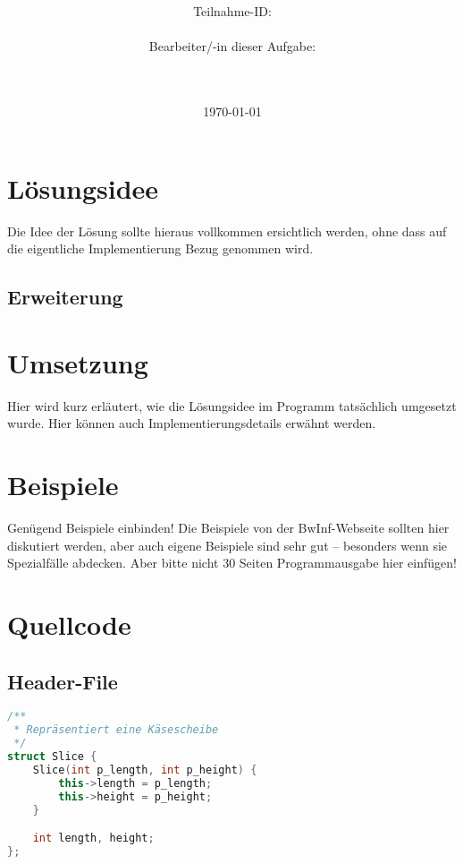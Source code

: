 \documentclass[a4paper,10pt,ngerman]{scrartcl}
\title{\textbf{\Huge\Aufgabe}}
\author{\LARGE Teilnahme-ID: \LARGE \TeilnahmeId \\\\
\LARGE Bearbeiter/-in dieser Aufgabe: \\
\LARGE \Name\\\\}
\date{\LARGE\today}
\begin{document}
    \maketitle
    \tableofcontents
    \vspace{0.5cm}
    \newpage

    \section{Lösungsidee}\label{sec:losungsidee}

    Die Idee der Lösung sollte hieraus vollkommen ersichtlich werden, ohne dass auf die eigentliche Implementierung Bezug genommen wird.
    \subsection{Erweiterung}\label{subsec:erweiterung_losungsidee}

    \section{Umsetzung}\label{sec:umsetzung}
    Hier wird kurz erläutert, wie die Lösungsidee im Programm tatsächlich umgesetzt wurde.
    Hier können auch Implementierungsdetails erwähnt werden.

    \section{Beispiele}\label{sec:beispiele}
    Genügend Beispiele einbinden!
    Die Beispiele von der BwInf-Webseite sollten hier diskutiert werden, aber auch eigene Beispiele sind sehr gut – besonders wenn sie Spezialfälle abdecken. Aber bitte nicht 30 Seiten Programmausgabe hier einfügen!

    \newpage
    \section{Quellcode}
    \label{sec:quellcode}
    \label{LastPage}
    \subsection{Header-File}\label{subsec:header-file}

    \begin{lstlisting}[frame=single,language=C++,title=Struct Slice,breaklines=true,label={lst:code_slice}]
/**
 * Repräsentiert eine Käsescheibe
 */
struct Slice {
    Slice(int p_length, int p_height) {
        this->length = p_length;
        this->height = p_height;
    }

    int length, height;
};
    \end{lstlisting}
\end{document}
